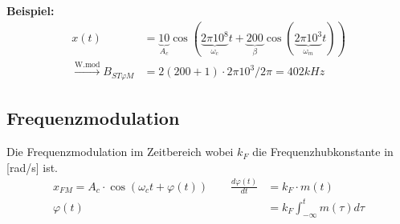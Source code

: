 \textbf{Beispiel:}\\
\begin{align*}
	x(t) &= \underbrace{10}_{A_c}\cos(\underbrace{2\pi10^8}_{\omega_c}t+\underbrace{200}_{\beta}\cos(\underbrace{2\pi10^3}_{\omega_m}t)) \\
	\xrightarrow{\text{W.mod}} B_{ST\varphi M} &= 2(200+1)\cdot 2\pi 10^3 / 2 \pi = 402kHz
\end{align*}


\subsection{Frequenzmodulation}
Die Frequenzmodulation im Zeitbereich wobei $k_F$ die Frequenzhubkonstante in [rad/s] ist.
\begin{align*}
	x_{FM} = A_c\cdot\cos(\omega_ct + \varphi(t)) \qquad \frac{d\varphi(t)}{dt} &= k_F\cdot m(t) \\
	\varphi(t) &= k_F\int_{-\infty}^{t}m(\tau)d\tau
\end{align*}
